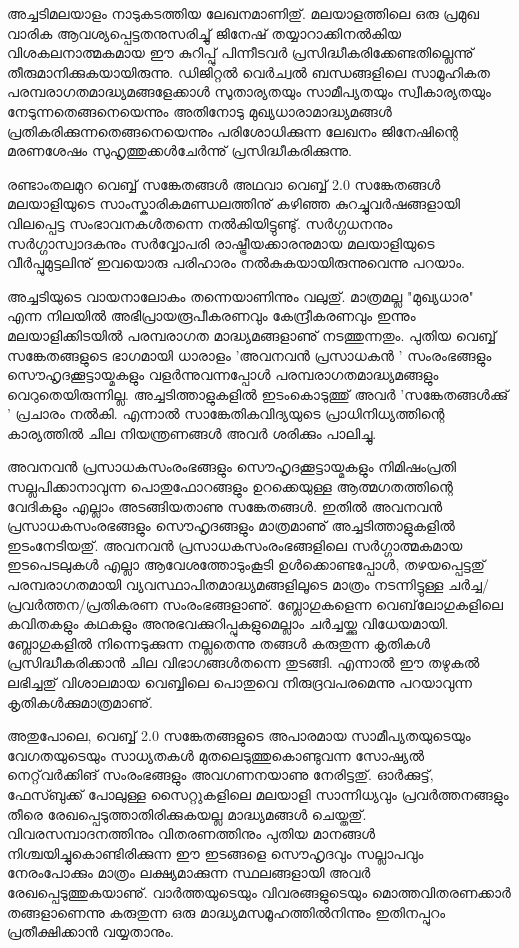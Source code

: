 ﻿
\vskip 2pt

\begin{framed}
അച്ചടിമലയാളം നാടുകടത്തിയ ലേഖനമാണിതു്. മലയാളത്തിലെ ഒരു പ്രമുഖ വാരിക ആവശ്യപ്പെട്ടതനുസരിച്ചു് ജിനേഷ് 
തയ്യാറാക്കിനല്‍കിയ വിശകലനാത്മകമായ ഈ കുറിപ്പു് പിന്നീടവര്‍ പ്രസിദ്ധീകരിക്കേണ്ടതില്ലെന്നു് തീരുമാനിക്കുകയായിരുന്നു.
 ഡിജിറ്റല്‍ വെര്‍ച്വല്‍ ബന്ധങ്ങളിലെ സാമൂഹികത പരമ്പരാഗതമാദ്ധ്യമങ്ങളേക്കാള്‍ സുതാര്യതയും സാമീപ്യതയും സ്വീകാര്യതയും 
നേടുന്നതെങ്ങനെയെന്നും അതിനോടു മുഖ്യധാരാമാദ്ധ്യമങ്ങള്‍ പ്രതികരിക്കുന്നതെങ്ങനെയെന്നും പരിശോധിക്കുന്ന ലേഖനം 
ജിനേഷിന്റെ മരണശേഷം സുഹൃത്തുക്കള്‍ചേര്‍ന്നു് പ്രസിദ്ധീകരിക്കുന്നു.
\end{framed}


രണ്ടാംതലമുറ വെബ്ബ് സങ്കേതങ്ങള്‍ അഥവാ വെബ്ബ് 2.0 സങ്കേതങ്ങള്‍ മലയാളിയുടെ സാംസ്കാരികമണ്ഡലത്തിനു് 
കഴിഞ്ഞ കുറച്ചുവര്‍ഷങ്ങളായി വിലപ്പെട്ട സംഭാവനകള്‍തന്നെ നല്‍കിയിട്ടുണ്ടു്. സര്‍ഗ്ഗധനനും സര്‍ഗ്ഗാസ്വാദകനും സര്‍വ്വോപരി രാഷ്ട്രീയക്കാരനുമായ 
മലയാളിയുടെ വീര്‍പ്പുമുട്ടലിനു് ഇവയൊരു പരിഹാരം നല്‍കുകയായിരുന്നുവെന്നു പറയാം.

അച്ചടിയുടെ വായനാലോകം തന്നെയാണിന്നും വലുതു്. മാത്രമല്ല "മുഖ്യധാര" എന്ന നിലയില്‍ അഭിപ്രായരൂപീകരണവും 
കേന്ദ്രീകരണവും ഇന്നും മലയാളിക്കിടയില്‍ പരമ്പരാഗത മാദ്ധ്യമങ്ങളാണു് നടത്തുന്നതും. പുതിയ വെബ്ബ് സങ്കേതങ്ങളുടെ ഭാഗമായി
 ധാരാളം 'അവനവന്‍ പ്രസാധകന്‍ ' സംരംഭങ്ങളും സൌഹൃദക്കൂട്ടായ്മകളും വളര്‍ന്നുവന്നപ്പോള്‍ പരമ്പരാഗതമാദ്ധ്യമങ്ങളും 
വെറുതെയിരുന്നില്ല. അച്ചടിത്താളുകളില്‍ ഇടംകൊടുത്തു് അവര്‍ 'സങ്കേതങ്ങള്‍ക്കു് ' പ്രചാരം നല്‍കി. എന്നാല്‍ സാങ്കേതികവിദ്യയുടെ
 പ്രാധിനിധ്യത്തിന്റെ കാര്യത്തില്‍ ചില നിയന്ത്രണങ്ങള്‍ അവര്‍ ശരിക്കും പാലിച്ചു.

അവനവന്‍ പ്രസാധകസംരംഭങ്ങളും സൌഹൃദക്കൂട്ടായ്മകളും നിമിഷംപ്രതി സല്ലപിക്കാനാവുന്ന പൊതുഫോറങ്ങളും ഉറക്കെയുള്ള 
ആത്മഗതത്തിന്റെ വേദികളും എല്ലാം അടങ്ങിയതാണു സങ്കേതങ്ങള്‍. ഇതില്‍ അവനവന്‍ പ്രസാധകസംരഭങ്ങളും സൌഹൃദങ്ങളും
 മാത്രമാണു് അച്ചടിത്താളുകളില്‍ ഇടംനേടിയതു്. അവനവന്‍ പ്രസാധകസംരംഭങ്ങളിലെ സര്‍ഗ്ഗാത്മകമായ ഇടപെടലുകള്‍ എല്ലാ 
ആവേശത്തോടുംകൂടി ഉള്‍ക്കൊണ്ടപ്പോള്‍, തഴയപ്പെട്ടതു് പരമ്പരാഗതമായി വ്യവസ്ഥാപിതമാദ്ധ്യമങ്ങളിലൂടെ മാത്രം നടന്നിട്ടുള്ള 
ചര്‍ച്ച/പ്രവര്‍ത്തന/പ്രതികരണ സംരംഭങ്ങളാണു്. ബ്ലോഗുകളെന്ന വെബ്‌ലോഗുകളിലെ കവിതകളും കഥകളും 
അനുഭവക്കുറിപ്പുകളുമെല്ലാം ചര്‍ച്ചയ്ക്കു വിധേയമായി. ബ്ലോഗുകളില്‍ നിന്നെടുക്കുന്ന നല്ലതെന്നു തങ്ങള്‍ കരുതുന്ന കൃതികള്‍ 
പ്രസിദ്ധീകരിക്കാന്‍ ചില വിഭാഗങ്ങള്‍തന്നെ തുടങ്ങി. എന്നാല്‍ ഈ തഴുകല്‍ ലഭിച്ചതു് വിശാലമായ വെബ്ബിലെ പൊതുവെ 
നിരുദ്രവപരമെന്നു പറയാവുന്ന കൃതികള്‍ക്കുമാത്രമാണു്.

അതുപോലെ, വെബ്ബ് 2.0 സങ്കേതങ്ങളുടെ അപാരമായ സാമീപ്യതയുടെയും വേഗതയുടെയും സാധ്യതകള്‍ മുതലെടുത്തുകൊണ്ടുവന്ന
 സോഷ്യല്‍ നെറ്റ്‌വര്‍ക്കിങ് സംരംഭങ്ങളും അവഗണനയാണു നേരിട്ടതു്. ഓര്‍ക്കുട്ട്, ഫേസ്ബുക്ക് പോലുള്ള സൈറ്റുകളിലെ മലയാളി
 സാന്നിധ്യവും പ്രവര്‍ത്തനങ്ങളും തീരെ രേഖപ്പെടുത്താതിരിക്കുകയല്ല മാദ്ധ്യമങ്ങള്‍ ചെയ്തതു്. വിവരസമ്പാദനത്തിനും 
വിതരണത്തിനും പുതിയ മാനങ്ങള്‍ നിശ്ചയിച്ചുകൊണ്ടിരിക്കുന്ന ഈ ഇടങ്ങളെ സൌഹൃദവും സല്ലാപവും നേരംപോക്കും മാത്രം 
ലക്ഷ്യമാക്കുന്ന സ്ഥലങ്ങളായി അവര്‍ രേഖപ്പെടുത്തുകയാണു്. വാര്‍ത്തയുടെയും വിവരങ്ങളുടെയും മൊത്തവിതരണക്കാര്‍ തങ്ങളാണെന്നു
 കരുതുന്ന ഒരു മാദ്ധ്യമസമൂഹത്തില്‍നിന്നും ഇതിനപ്പുറം പ്രതീക്ഷിക്കാന്‍ വയ്യതാനും.

